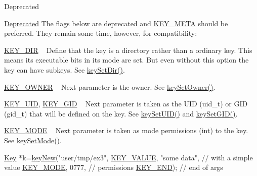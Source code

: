 \begin{DoxyRefDesc}{Deprecated}
\item[\hyperlink{deprecated__deprecated000010}{Deprecated}]The flags below are deprecated and \hyperlink{group__key_gga91fb3178848bd682000958089abbaf40a040582834bb2d90049947d7ef74e87e2}{K\+E\+Y\+\_\+\+M\+E\+TA} should be preferred. They remain some time, however, for compatibility\+:
\begin{DoxyItemize}
\item \hyperlink{group__key_gga91fb3178848bd682000958089abbaf40a9e43e47c8a21478538e2d20e049981d5}{K\+E\+Y\+\_\+\+D\+IR} ~\newline
 Define that the key is a directory rather than a ordinary key. This means its executable bits in its mode are set. But even without this option the key can have subkeys. See \hyperlink{group__meta_gaae575bd86a628a15ee45baa860522e75}{key\+Set\+Dir()}.
\item \hyperlink{group__key_gga91fb3178848bd682000958089abbaf40a77ca60362fa8daca8d5347db4385068b}{K\+E\+Y\+\_\+\+O\+W\+N\+ER} ~\newline
 Next parameter is the owner. See \hyperlink{owner_8c_a88d6ec200ba0707b7c1b4a88133d2be4}{key\+Set\+Owner()}.
\item \hyperlink{group__key_gga91fb3178848bd682000958089abbaf40a28f01a87d65f065172f734c9c9446c0e}{K\+E\+Y\+\_\+\+U\+ID}, \hyperlink{group__key_gga91fb3178848bd682000958089abbaf40ac0628bbaba7c837ca73323681393d15f}{K\+E\+Y\+\_\+\+G\+ID} ~\newline
 Next parameter is taken as the U\+ID (uid\+\_\+t) or G\+ID (gid\+\_\+t) that will be defined on the key. See \hyperlink{group__meta_gab5f284f5ecd261e0a290095f50ba1af7}{key\+Set\+U\+I\+D()} and \hyperlink{group__meta_ga9e3d0fb3f7ba906e067727b9155d22e3}{key\+Set\+G\+I\+D()}.
\item \hyperlink{group__key_gga91fb3178848bd682000958089abbaf40a1b0a91ff3a855d6993930ebf0abaa518}{K\+E\+Y\+\_\+\+M\+O\+DE} ~\newline
 Next parameter is taken as mode permissions (int) to the key. See \hyperlink{group__meta_ga8803037e35b9da1ce492323a88ff6bc3}{key\+Set\+Mode()}. 
\begin{DoxyCodeInclude}
\hyperlink{classkdb_1_1Key_a5679f5cae63caddd64a60388b9cc77fa}{Key} *k=\hyperlink{group__key_gad23c65b44bf48d773759e1f9a4d43b89}{keyNew}(\textcolor{stringliteral}{"user/tmp/ex3"},
        \hyperlink{group__key_gga91fb3178848bd682000958089abbaf40ac66e4a49d09212b79f5754ca6db5bd2e}{KEY\_VALUE}, \textcolor{stringliteral}{"some data"},    \textcolor{comment}{// with a simple value}
        \hyperlink{group__key_gga91fb3178848bd682000958089abbaf40a1b0a91ff3a855d6993930ebf0abaa518}{KEY\_MODE}, 0777,            \textcolor{comment}{// permissions}
        \hyperlink{group__key_gga91fb3178848bd682000958089abbaf40aa8adb6fcb92dec58fb19410eacfdd403}{KEY\_END});                  \textcolor{comment}{// end of args}
\end{DoxyCodeInclude}


\end{DoxyItemize}
\end{DoxyRefDesc}
